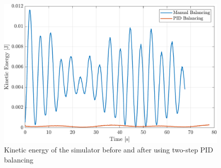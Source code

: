 \begin{figure}[!ht]
    \centering
    \includegraphics[width=\linewidth]{plots/hardware_verification_KE.pdf}
    \caption{Kinetic energy of the simulator before and after using two-step PID balancing}
\end{figure}

